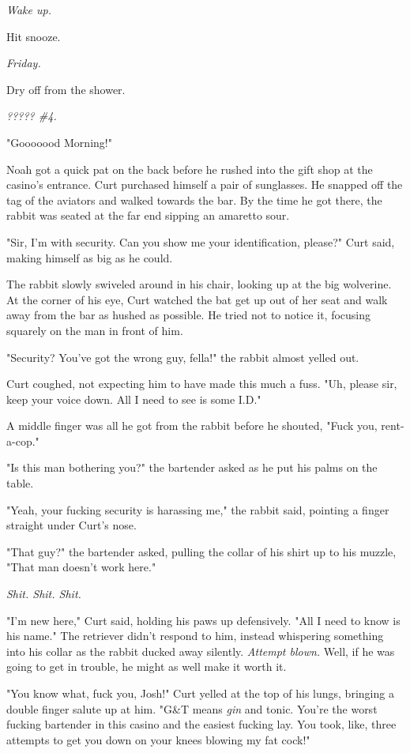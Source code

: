 \emph{Wake up.}

Hit snooze.

\emph{Friday.}

Dry off from the shower.

\emph{????? \#4.}

"Gooooood Morning!"

Noah got a quick pat on the back before he rushed into the gift shop at the casino's entrance. Curt purchased himself a pair of sunglasses. He snapped off the tag of the aviators and walked towards the bar. By the time he got there, the rabbit was seated at the far end sipping an amaretto sour.

"Sir, I'm with security. Can you show me your identification, please?" Curt said, making himself as big as he could.

The rabbit slowly swiveled around in his chair, looking up at the big wolverine. At the corner of his eye, Curt watched the bat get up out of her seat and walk away from the bar as hushed as possible. He tried not to notice it, focusing squarely on the man in front of him.

"Security? You've got the wrong guy, fella!" the rabbit almost yelled out.

Curt coughed, not expecting him to have made this much a fuss. "Uh, please sir, keep your voice down. All I need to see is some I.D."

A middle finger was all he got from the rabbit before he shouted, "Fuck you, rent-a-cop."

"Is this man bothering you?" the bartender asked as he put his palms on the table.

"Yeah, your fucking security is harassing me," the rabbit said, pointing a finger straight under Curt's nose.

"That guy?" the bartender asked, pulling the collar of his shirt up to his muzzle, "That man doesn't work here."

\emph{Shit. Shit. Shit.}

"I'm new here," Curt said, holding his paws up defensively. "All I need to know is his name." The retriever didn't respond to him, instead whispering something into his collar as the rabbit ducked away silently. \emph{Attempt blown.} Well, if he was going to get in trouble, he might as well make it worth it.

"You know what, fuck you, Josh!" Curt yelled at the top of his lungs, bringing a double finger salute up at him. "G\&T means \emph{gin} and tonic. You're the worst fucking bartender in this casino and the easiest fucking lay. You took, like, three attempts to get you down on your knees blowing my fat cock!"

